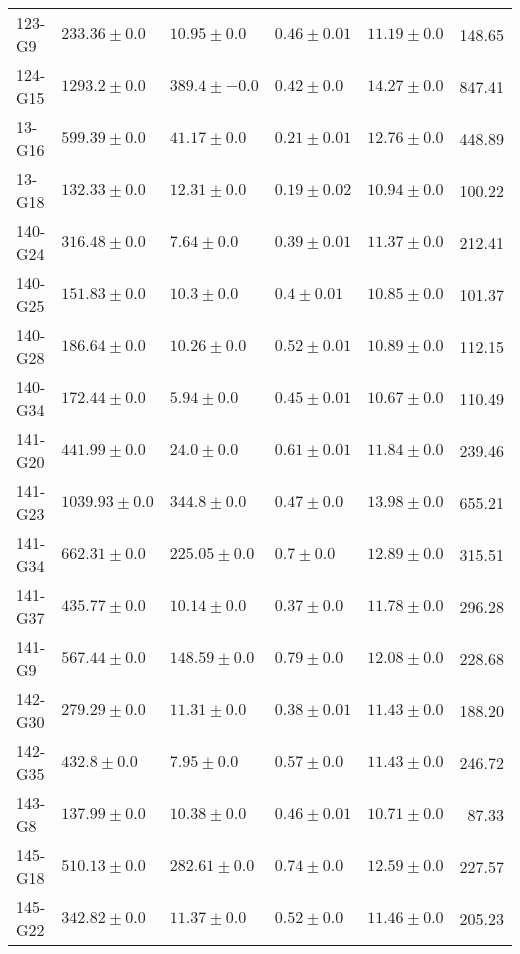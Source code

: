 \begin{tabular}{lllllr}
     123-G9 &     $233.36 \pm 0.0$ &       $10.95 \pm 0.0$ &  $0.46 \pm 0.01$ &  $11.19 \pm 0.0$ &    148.65 \\
    124-G15 &     $1293.2 \pm 0.0$ &      $389.4 \pm -0.0$ &   $0.42 \pm 0.0$ &  $14.27 \pm 0.0$ &    847.41 \\
     13-G16 &     $599.39 \pm 0.0$ &       $41.17 \pm 0.0$ &  $0.21 \pm 0.01$ &  $12.76 \pm 0.0$ &    448.89 \\
     13-G18 &     $132.33 \pm 0.0$ &       $12.31 \pm 0.0$ &  $0.19 \pm 0.02$ &  $10.94 \pm 0.0$ &    100.22 \\
    140-G24 &     $316.48 \pm 0.0$ &        $7.64 \pm 0.0$ &  $0.39 \pm 0.01$ &  $11.37 \pm 0.0$ &    212.41 \\
    140-G25 &     $151.83 \pm 0.0$ &        $10.3 \pm 0.0$ &   $0.4 \pm 0.01$ &  $10.85 \pm 0.0$ &    101.37 \\
    140-G28 &     $186.64 \pm 0.0$ &       $10.26 \pm 0.0$ &  $0.52 \pm 0.01$ &  $10.89 \pm 0.0$ &    112.15 \\
    140-G34 &     $172.44 \pm 0.0$ &        $5.94 \pm 0.0$ &  $0.45 \pm 0.01$ &  $10.67 \pm 0.0$ &    110.49 \\
    141-G20 &     $441.99 \pm 0.0$ &        $24.0 \pm 0.0$ &  $0.61 \pm 0.01$ &  $11.84 \pm 0.0$ &    239.46 \\
    141-G23 &    $1039.93 \pm 0.0$ &       $344.8 \pm 0.0$ &   $0.47 \pm 0.0$ &  $13.98 \pm 0.0$ &    655.21 \\
    141-G34 &     $662.31 \pm 0.0$ &      $225.05 \pm 0.0$ &    $0.7 \pm 0.0$ &  $12.89 \pm 0.0$ &    315.51 \\
    141-G37 &     $435.77 \pm 0.0$ &       $10.14 \pm 0.0$ &   $0.37 \pm 0.0$ &  $11.78 \pm 0.0$ &    296.28 \\
     141-G9 &     $567.44 \pm 0.0$ &      $148.59 \pm 0.0$ &   $0.79 \pm 0.0$ &  $12.08 \pm 0.0$ &    228.68 \\
    142-G30 &     $279.29 \pm 0.0$ &       $11.31 \pm 0.0$ &  $0.38 \pm 0.01$ &  $11.43 \pm 0.0$ &    188.20 \\
    142-G35 &      $432.8 \pm 0.0$ &        $7.95 \pm 0.0$ &   $0.57 \pm 0.0$ &  $11.43 \pm 0.0$ &    246.72 \\
     143-G8 &     $137.99 \pm 0.0$ &       $10.38 \pm 0.0$ &  $0.46 \pm 0.01$ &  $10.71 \pm 0.0$ &     87.33 \\
    145-G18 &     $510.13 \pm 0.0$ &      $282.61 \pm 0.0$ &   $0.74 \pm 0.0$ &  $12.59 \pm 0.0$ &    227.57 \\
    145-G22 &     $342.82 \pm 0.0$ &       $11.37 \pm 0.0$ &   $0.52 \pm 0.0$ &  $11.46 \pm 0.0$ &    205.23 \\

\end{tabular}
